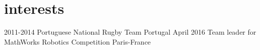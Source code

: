 \documentclass[]{friggeri-cv} %
\begin{document}




\section{interests}


\begin{entrylist}

\entry
{2011-2014}
{Portuguese National Rugby Team}
{Portugal}
{}
\entry
{April 2016}
{Team leader for MathWorks Robotics Competition}
{Paris-France}
{}
\end{entrylist}

\end{document}
